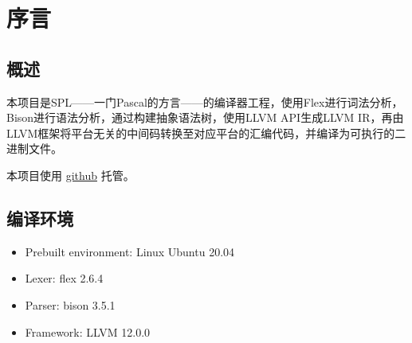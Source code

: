 \documentclass{article}
\begin{document}


\section*{序言}

\subsection*{概述}
\par 本项目是SPL——一门Pascal的方言——的编译器工程，使用Flex进行词法分析，Bison进行语法分析，通过构建抽象语法树，使用LLVM API生成LLVM IR，再由LLVM框架将平台无关的中间码转换至对应平台的汇编代码，并编译为可执行的二进制文件。
\par 本项目使用 \href{https://github.com/uninstalle/SPLCompiler}{github} 托管。

\subsection*{编译环境}
\begin{itemize}
    \item Prebuilt environment: Linux Ubuntu 20.04
    \item Lexer: flex 2.6.4
    \item Parser: bison 3.5.1
    \item Framework: LLVM 12.0.0
\end{itemize}
\end{document}
